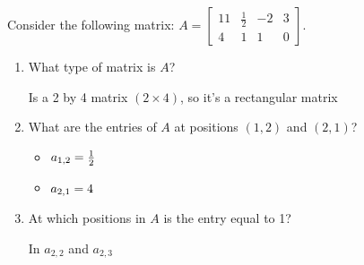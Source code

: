 \item Consider the following matrix: $A = \begin{bmatrix}
11 & \frac{1}{2} &  -2 & 3 \\
4 & 1 & 1 & 0
\end{bmatrix}.
$

    \begin{enumerate}
        \item What type of matrix is $A$?
                \begin{answer}
                    Is a 2 by 4 matrix $\left(2 \times 4\right)$, so it's a rectangular matrix
                \end{answer}
        \item What are the entries of $A$ at positions $\left(1, 2\right)$ and $\left(2, 1\right)$?
                \begin{answer}
                    \begin{itemize}
                        \item $\mathlarger{a}_{1,2} = \frac{1}{2}$
                        \item $\mathlarger{a}_{2,1} = 4$
                    \end{itemize}
                \end{answer}
        \item At which positions in $A$ is the entry equal to 1?
                \begin{answer}
                    In $a_{2,2}$ and $a_{2,3}$
                \end{answer}
    \end{enumerate}
